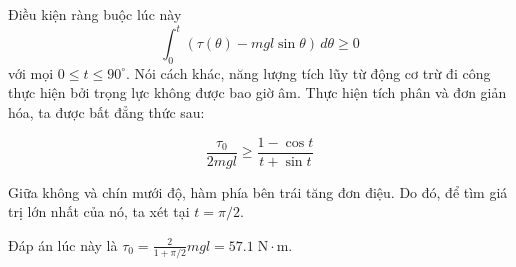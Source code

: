 \begin{solution}
    Điều kiện ràng buộc lúc này 
    $$\int_{0}^{t} (\tau (\theta)-mgl\sin \theta) \, d\theta \geq 0$$
    với mọi $0\leq t \leq 90^{\circ}$. Nói cách khác, năng lượng tích lũy từ động cơ trừ đi công thực hiện bởi trọng lực không được bao giờ âm. Thực hiện tích phân và đơn giản hóa, ta được bất đẳng thức sau:
    
    $$\frac{\tau_0}{2mgl}\geq\frac{1-\cos t}{t+\sin t}$$

    Giữa không và chín mưới độ, hàm phía bên trái tăng đơn điệu. Do đó, để tìm giá trị lớn nhất của nó, ta xét tại $t=\pi/2$.

    Đáp án lúc này là $\boxed{\tau_0=\frac{2}{1+\pi/2} mgl = 57.1\;\mathrm{N\cdot m}}$.
\end{solution}